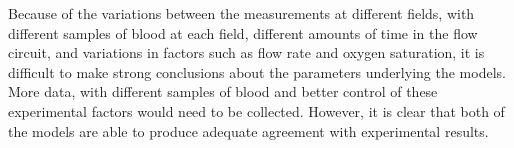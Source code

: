 Because of the variations between the measurements at different fields, with different samples of blood at each field, different amounts of time in the flow circuit, and variations in factors such as flow rate and oxygen saturation, it is difficult to make strong conclusions about the parameters underlying the models.
More data, with different samples of blood and better control of these experimental factors would need to be collected.
However, it is clear that both of the models are able to produce adequate agreement with experimental results.
